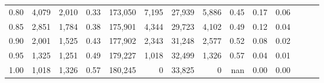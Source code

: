 \begin{tabular}{rrrrrrrrrrrrrr}
0.80 &   4,079 &  2,010 &  0.33 &  173,050 &    7,195 &  27,939 &   5,886 &  0.45 &  0.17 &      0.06 \\
0.85 &   2,851 &  1,784 &  0.38 &  175,901 &    4,344 &  29,723 &   4,102 &  0.49 &  0.12 &      0.04 \\
0.90 &   2,001 &  1,525 &  0.43 &  177,902 &    2,343 &  31,248 &   2,577 &  0.52 &  0.08 &      0.02 \\
0.95 &   1,325 &  1,251 &  0.49 &  179,227 &    1,018 &  32,499 &   1,326 &  0.57 &  0.04 &      0.01 \\
1.00 &   1,018 &  1,326 &  0.57 &  180,245 &        0 &  33,825 &       0 &   nan &  0.00 &      0.00 \\
\bottomrule
\end{tabular}
